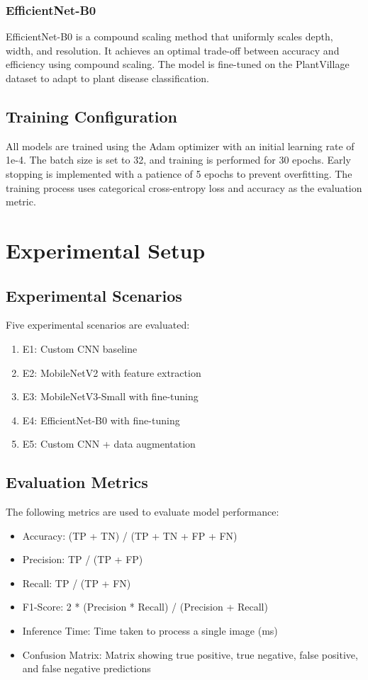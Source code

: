 \documentclass[conference]{IEEEtran}
\begin{document}
\subsubsection{EfficientNet-B0}
EfficientNet-B0 \cite{tan2019} is a compound scaling method that uniformly scales depth, width, and resolution. It achieves an optimal trade-off between accuracy and efficiency using compound scaling. The model is fine-tuned on the PlantVillage dataset to adapt to plant disease classification.

\subsection{Training Configuration}
All models are trained using the Adam optimizer with an initial learning rate of 1e-4. The batch size is set to 32, and training is performed for 30 epochs. Early stopping is implemented with a patience of 5 epochs to prevent overfitting. The training process uses categorical cross-entropy loss and accuracy as the evaluation metric.

\section{Experimental Setup}
\subsection{Experimental Scenarios}
Five experimental scenarios are evaluated:
\begin{enumerate}
\item E1: Custom CNN baseline
\item E2: MobileNetV2 with feature extraction
\item E3: MobileNetV3-Small with fine-tuning
\item E4: EfficientNet-B0 with fine-tuning
\item E5: Custom CNN + data augmentation
\end{enumerate}

\subsection{Evaluation Metrics}
The following metrics are used to evaluate model performance:
\begin{itemize}
\item Accuracy: (TP + TN) / (TP + TN + FP + FN)
\item Precision: TP / (TP + FP)
\item Recall: TP / (TP + FN)
\item F1-Score: 2 * (Precision * Recall) / (Precision + Recall)
\item Inference Time: Time taken to process a single image (ms)
\item Confusion Matrix: Matrix showing true positive, true negative, false positive, and false negative predictions
\end{itemize}
\end{document}
